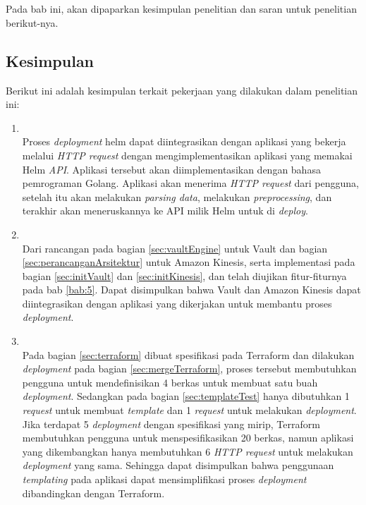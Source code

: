 \chapter{\kesimpulan}
\label{bab:6}
Pada bab ini, akan dipaparkan kesimpulan penelitian dan saran untuk penelitian berikut-nya.


\section{Kesimpulan}
\label{sec:kesimpulan}
Berikut ini adalah kesimpulan terkait pekerjaan yang dilakukan dalam penelitian ini:
\begin{enumerate}
	\item {} \\
	Proses \textit{deployment} helm dapat diintegrasikan dengan aplikasi yang bekerja melalui \textit{HTTP request} dengan mengimplementasikan aplikasi yang memakai Helm \textit{API}. Aplikasi tersebut akan diimplementasikan dengan bahasa pemrograman Golang. Aplikasi akan menerima \textit{HTTP request} dari pengguna, setelah itu akan melakukan \textit{parsing data}, melakukan \textit{preprocessing}, dan terakhir akan meneruskannya ke API milik Helm untuk di \textit{deploy}.
	\item {} \\
	Dari rancangan pada bagian \ref{sec:vaultEngine} untuk Vault dan bagian \ref{sec:perancanganArsitektur} untuk Amazon Kinesis, serta implementasi pada bagian \ref{sec:initVault} dan \ref{sec:initKinesis}, dan telah diujikan fitur-fiturnya pada bab \ref{bab:5}. Dapat disimpulkan bahwa Vault dan Amazon Kinesis dapat diintegrasikan dengan aplikasi yang dikerjakan untuk membantu proses \textit{deployment}.
	\item {} \\
    Pada bagian \ref{sec:terraform} dibuat spesifikasi pada Terraform dan dilakukan \textit{deployment} pada bagian \ref{sec:mergeTerraform}, proses tersebut membutuhkan pengguna untuk mendefinisikan 4 berkas untuk membuat satu buah \textit{deployment}. Sedangkan pada bagian \ref{sec:templateTest} hanya dibutuhkan 1 \textit{request} untuk membuat \textit{template} dan 1 \textit{request} untuk melakukan \textit{deployment}. Jika terdapat 5 \textit{deployment} dengan spesifikasi yang mirip, Terraform membutuhkan pengguna untuk menspesifikasikan 20 berkas, namun aplikasi yang dikembangkan hanya membutuhkan 6 \textit{HTTP request} untuk melakukan \textit{deployment} yang sama. Sehingga dapat disimpulkan bahwa penggunaan \textit{templating} pada aplikasi dapat mensimplifikasi proses \textit{deployment} dibandingkan dengan Terraform.
\end{enumerate}


